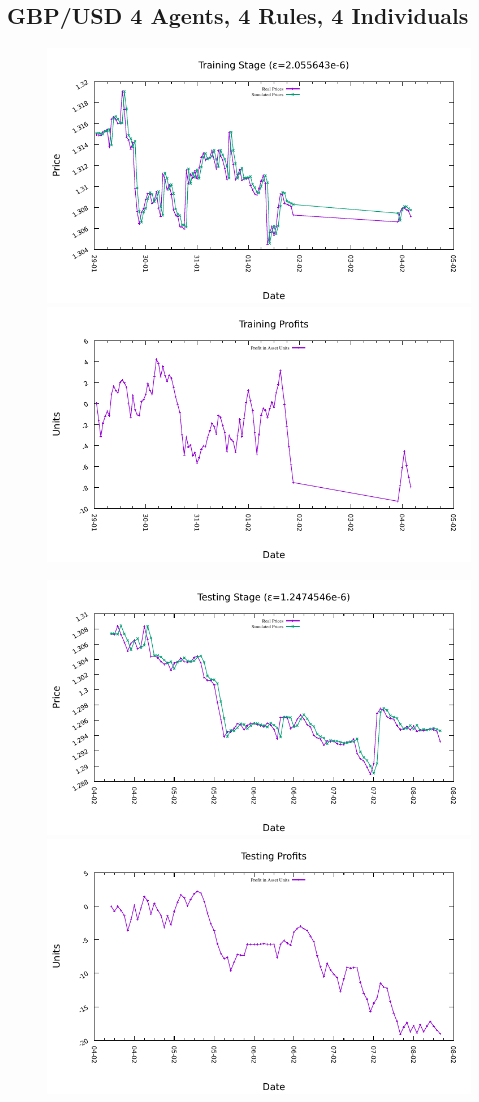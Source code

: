 





\subsection{GBP/USD 4 Agents, 4 Rules, 4 Individuals}
\label{results:forecast-gbp-usd-4agents-4rules-4individuals}

\begin{figure}[htp]
  \centering

  \includegraphics[width=.45\textwidth]{img/plots/gbp_usd_h1-4agents-4rules-4ind-100gen_training_fit.pdf}\quad
  \includegraphics[width=.45\textwidth]{img/plots/gbp_usd_h1-4agents-4rules-4ind-100gen_training_profits.pdf}

  \medskip

  \includegraphics[width=.45\textwidth]{img/plots/gbp_usd_h1-4agents-4rules-4ind-100gen_testing_fit.pdf}\quad
  \includegraphics[width=.45\textwidth]{img/plots/gbp_usd_h1-4agents-4rules-4ind-100gen_testing_profits.pdf}


\end{figure}
